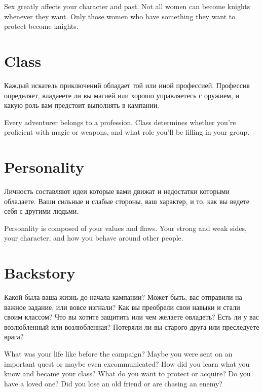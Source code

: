 \documentclass[a5paper,11pt]{book}
\begin{document}
\begin{multicols}{2}
\begin{en}
Sex greatly affects your character and past. Not all women can become knights whenever they want. Only those women who have something they want to protect become knights.
\end{en}

\section{Class}
\begin{ru}
Каждый искатель приключений обладает той или иной профессией. Профессия определяет, владаеете ли вы магией или хорошо управляетесь с оружием, и какую роль вам предстоит выполнять в кампании.
\end{ru}

\begin{en}
Every adventurer belongs to a profession. Class determines whether you're proficient with magic or weapons, and what role you'll be filling in your group.
\end{en}

\section{Personality}
\begin{ru}
Личность составляют идеи которые вами движат и недостатки которыми обладаете. Ваши сильные и слабые стороны, ваш характер, и то, как вы ведете себя с другими людьми.
\end{ru}

\begin{en}
Personality is composed of your values and flaws. Your strong and weak sides, your character, and how you behave around other people.
\end{en}

\section{Backstory}
\begin{ru}
Какой была ваша жизнь до начала кампании? Может быть, вас отправили на важное задание, или вовсе изгнали? Как вы преобрели свои навыки и стали своим классом? Что вы хотите защитить или чем желаете овладеть? Есть ли у вас возлюбленный или возлюбленная? Потеряли ли вы старого друга или преследуете врага?
\end{ru}

\begin{en}
What was your life like before the campaign? Maybe you were sent on an important quest or maybe even excommunicated? How did you learn what you know and became your class? What do you want to protect or acquire? Do you have a loved one? Did you lose an old friend or are chasing an enemy?
\end{en}


\end{multicols}
\end{document}
